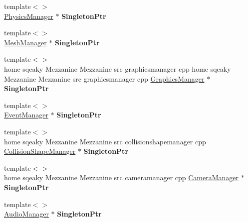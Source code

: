\begin{DoxyCompactItemize}
\item 
\hypertarget{classMezzanine_1_1Singleton_ac923e5b8546f94e614608c60b3187a77}{
{\footnotesize template$<$$>$ }\\\hyperlink{classMezzanine_1_1PhysicsManager}{PhysicsManager} $\ast$ {\bfseries SingletonPtr}}
\label{classMezzanine_1_1Singleton_ac923e5b8546f94e614608c60b3187a77}

\item 
\hypertarget{classMezzanine_1_1Singleton_aa773394d88e689a49d72de8bbd87c12d}{
{\footnotesize template$<$$>$ }\\\hyperlink{classMezzanine_1_1MeshManager}{MeshManager} $\ast$ {\bfseries SingletonPtr}}
\label{classMezzanine_1_1Singleton_aa773394d88e689a49d72de8bbd87c12d}

\item 
\hypertarget{classMezzanine_1_1Singleton_a6789d8f27462cec2de66e891ac31a791}{
{\footnotesize template$<$$>$ }\\home sqeaky Mezzanine Mezzanine src graphicsmanager cpp home sqeaky Mezzanine Mezzanine src graphicsmanager cpp \hyperlink{classMezzanine_1_1GraphicsManager}{GraphicsManager} $\ast$ {\bfseries SingletonPtr}}
\label{classMezzanine_1_1Singleton_a6789d8f27462cec2de66e891ac31a791}

\item 
\hypertarget{classMezzanine_1_1Singleton_a8376157cc0e67cf8448bc1724e5c2ade}{
{\footnotesize template$<$$>$ }\\\hyperlink{classMezzanine_1_1EventManager}{EventManager} $\ast$ {\bfseries SingletonPtr}}
\label{classMezzanine_1_1Singleton_a8376157cc0e67cf8448bc1724e5c2ade}

\item 
\hypertarget{classMezzanine_1_1Singleton_a1a34efe9afcd59d53e6bd0f1092664b1}{
{\footnotesize template$<$$>$ }\\home sqeaky Mezzanine Mezzanine src collisionshapemanager cpp \hyperlink{classMezzanine_1_1CollisionShapeManager}{CollisionShapeManager} $\ast$ {\bfseries SingletonPtr}}
\label{classMezzanine_1_1Singleton_a1a34efe9afcd59d53e6bd0f1092664b1}

\item 
\hypertarget{classMezzanine_1_1Singleton_a95c4ea681b5921599ffd1a29f5b155e6}{
{\footnotesize template$<$$>$ }\\home sqeaky Mezzanine Mezzanine src cameramanager cpp \hyperlink{classMezzanine_1_1CameraManager}{CameraManager} $\ast$ {\bfseries SingletonPtr}}
\label{classMezzanine_1_1Singleton_a95c4ea681b5921599ffd1a29f5b155e6}

\item 
\hypertarget{classMezzanine_1_1Singleton_a2280f1ce7ec5bc5afa7c4ab5fbf37c66}{
{\footnotesize template$<$$>$ }\\\hyperlink{classMezzanine_1_1AudioManager}{AudioManager} $\ast$ {\bfseries SingletonPtr}}
\label{classMezzanine_1_1Singleton_a2280f1ce7ec5bc5afa7c4ab5fbf37c66}

\end{DoxyCompactItemize}
